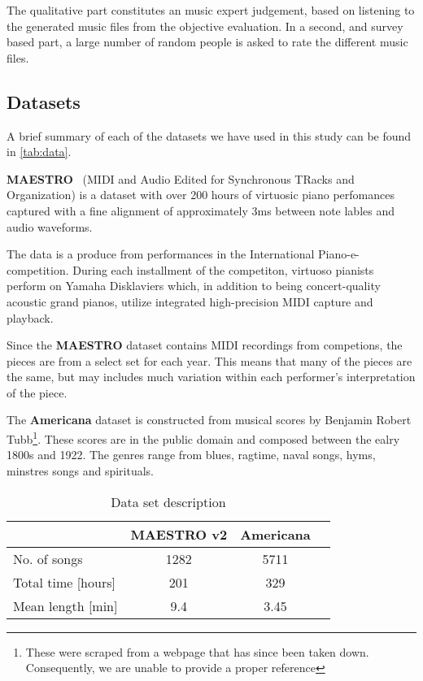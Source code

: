 \documentclass{IEEEtran}
\begin{document}
        The qualitative part constitutes an music expert judgement,
        based on listening to the generated music files from the objective evaluation.
        In a second, and survey based part, a large number of random people is asked
        to rate the different music files.
        
    \subsection{Datasets}

        A brief summary of each of the datasets we have used in this study 
        can be found in \autoref{tab:data}.

        \textbf{MAESTRO}~\cite{maestrodataset}
        (MIDI and Audio Edited for Synchronous TRacks and Organization)
        is a dataset with over 200 hours of virtuosic piano perfomances captured with 
        a fine alignment of approximately 3ms between note lables and audio waveforms.

        The data is a produce from performances in the International Piano-e-competition.
        During each installment of the competiton, virtuoso pianists perform on Yamaha
        Disklaviers which, in addition to being concert-quality acoustic grand pianos,
        utilize integrated high-precision MIDI capture and playback.
            
        Since the \textbf{MAESTRO} dataset contains MIDI recordings from competions, 
        the pieces are from a select set for each year. This means that many of the 
        pieces are the same, but may includes much variation within each
        performer's interpretation of the piece. 

        The \textbf{Americana} dataset is constructed from musical scores by 
        Benjamin Robert Tubb\footnote{These were scraped from a webpage that has 
        since been taken down. Consequently, we are unable to provide a proper 
        reference}. These scores are in the public domain and composed between
        the ealry 1800s and 1922. The genres range from blues, ragtime, naval songs,
        hyms, minstres songs and spirituals. 
    
    \begin{table}
    \begin{center}
        \caption{
            Data set description
            \label{tab:data}
        }
        \begin{tabular}{l c c c} \hline
            & MAESTRO v2 & Americana \\ \hline\hline
        No. of songs & 1282 & 5711 \\ \hline
        Total time [hours] & 201 & 329 \\ \hline
        Mean length [min] & 9.4 & 3.45  \\ \hline
       \end{tabular}
    \end{center}
    \end{table}
\end{document}
